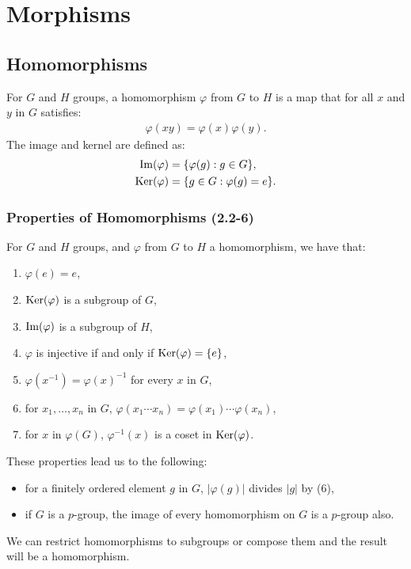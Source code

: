 \section{Morphisms}

\subsection{Homomorphisms}

For $G$ and $H$ groups, a homomorphism $\varphi$ from $G$ to $H$ is a map that 
for all $x$ and $y$ in $G$ satisfies:
\begin{align*}
    \varphi(xy) = \varphi(x)\varphi(y).
\end{align*} The image and kernel are defined as: \begin{align*}
    \operatorname{Im}(\varphi) &= \{\varphi(g) : g \in G\}, \\
    \operatorname{Ker}(\varphi) &= \{g \in G : \varphi(g) = e\}.
\end{align*} 

\subsubsection{Properties of Homomorphisms (2.2-6)} 
\label{2.2} \label{2.3} \label{2.4} \label{2.5} \label{2.6}

For $G$ and $H$ groups, and $\varphi$ from $G$ to $H$ a homomorphism, we have that:
\begin{enumerate}
    \item $\varphi(e) = e$,
    \item $\operatorname{Ker}(\varphi)$ is a subgroup of $G$,
    \item $\operatorname{Im}(\varphi)$ is a subgroup of $H$,
    \item $\varphi$ is injective if and only if $\operatorname{Ker}(\varphi) = \{e\}$,
    \item $\varphi(x^{-1}) = \varphi(x)^{-1}$ for every $x$ in $G$,
    \item for $x_1, \ldots, x_n$ in $G$,
        $\varphi(x_1 \cdots x_n) = \varphi(x_1) \cdots \varphi(x_n)$,
    \item for $x$ in $\varphi(G)$, $\varphi^{-1}(x)$ is a coset in $\operatorname{Ker}(\varphi)$.
\end{enumerate} These properties lead us to the following: \begin{itemize}
    \item for a finitely ordered element $g$ in $G$, $|\varphi(g)|$
        divides $|g|$ by (6),
    \item if $G$ is a $p$-group, the image of every
        homomorphism on $G$ is a $p$-group also.
\end{itemize} We can restrict homomorphisms to subgroups or compose them
and the result will be a homomorphism.

